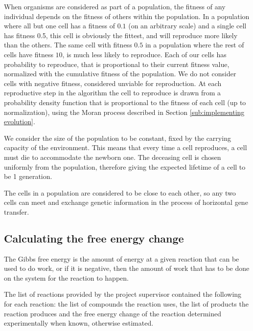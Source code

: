 \documentclass[a4paper,12pt]{article}
\begin{document}
	When organisms are considered as part of a population, the fitness of any individual depends on the fitness of others within the population. In a population where all but one cell has a fitness of $0.1$ (on an arbitrary scale) and a single cell has fitness 0.5, this cell is obviously the fittest, and will reproduce more likely than the others. The same cell with fitness $0.5$ in a population where the rest of cells have fitness $10$, is much less likely to reproduce. Each of our cells has probability to reproduce, that is proportional to their current fitness value, normalized with the cumulative fitness of the population. We do not consider cells with negative fitness, considered unviable for reproduction. At each reproductive step in the algorithm the cell to reproduce is drawn from a probability density function that is proportional to the fitness of each cell (up to normalization), using the Moran process described in Section \ref{sub:implementing evolution}.


	We consider the size of the population to be constant, fixed by the carrying capacity of the environment. This means that every time a cell reproduces, a cell must die to accommodate the newborn one. The deceasing cell is chosen uniformly from the population, therefore giving the expected lifetime of a cell to be 1 generation.

	The cells in a population are considered to be close to each other, so any two cells can meet and exchange genetic information in the process of horizontal gene transfer.

\subsection{Calculating the free energy change}
\label{sub:The free energy change}

	The Gibbs free energy is the amount of energy at a given reaction that can be used to do work, or if it is negative, then the amount of work that has to be done on the system for the reaction to happen. 


	The list of reactions provided by the project supervisor contained the following for each reaction: the list of compounds the reaction uses, the list of products the reaction produces and the free energy change of the reaction determined experimentally when known, otherwise estimated.
	
\end{document}
